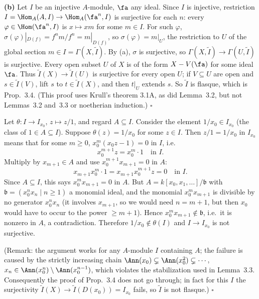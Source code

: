 \documentclass[11pt]{article}
\begin{document}
\textbf{(b)} Let $I$ be an injective $A$-module, $\fa$ any ideal. Since $I$ is injective, restriction $I=\Hom_A(A,I)\to\Hom_A(\fa^n,I)$ is surjective for each $n$: every $\varphi\in\Hom(\fa^n,I)$ is $x\mapsto xm$ for some $m\in I$. For such $\varphi$, $\sigma(\varphi)|_{D(f)}=f^nm/f^n=m|_{D(f)}$, so $\sigma(\varphi)=m|_U$, the restriction to $U$ of the global section $m\in I=\Gamma(X,\widetilde I)$. By (a), $\sigma$ is surjective, so $\Gamma(X,\widetilde I)\to\Gamma(U,\widetilde I)$ is surjective. Every open subset $U$ of $X$ is of the form $X-V(\fa)$ for some ideal $\fa$. Thus $\widetilde I(X)\to\widetilde I(U)$ is surjective for every open $U$; if $V\subseteq U$ are open and $s\in\widetilde I(V)$, lift $s$ to $t\in\widetilde I(X)$, and then $t|_U$ extends $s$. So $\widetilde I$ is flasque, which is Prop.~3.4. (This proof uses Krull's theorem 3.1A, as did Lemma~3.2, but not Lemmas~3.2 and~3.3 or noetherian induction.) \hfill$\square$

\pf
Let $\theta:I\to I_{x_0}$, $z\mapsto z/1$, and regard $A\subseteq I$. Consider the element $1/x_0\in I_{x_0}$ (the class of $1\in A\subseteq I$). Suppose $\theta(z)=1/x_0$ for some $z\in I$. Then $z/1=1/x_0$ in $I_{x_0}$ means that for some $m\ge0$, $x_0^m(x_0z-1)=0$ in $I$, i.e.
\[
x_0^{m+1}z=x_0^m\cdot1\quad\text{in }I.
\]
Multiply by $x_{m+1}\in A$ and use $x_0^{m+1}x_{m+1}=0$ in $A$:
\[
x_{m+1}x_0^m\cdot1=x_{m+1}x_0^{m+1}z=0\quad\text{in }I.
\]
Since $A\subseteq I$, this says $x_0^mx_{m+1}=0$ in $A$. But $A=k[x_0,x_1,\dots]/\mathfrak b$ with $\mathfrak b=(x_0^nx_n\mid n\ge1)$ a monomial ideal, and the monomial $x_0^mx_{m+1}$ is divisible by no generator $x_0^nx_n$ (it involves $x_{m+1}$, so we would need $n=m+1$, but then $x_0$ would have to occur to the power $\ge m+1$). Hence $x_0^mx_{m+1}\notin\mathfrak b$, i.e.\ it is nonzero in $A$, a contradiction. Therefore $1/x_0\notin\theta(I)$ and $I\to I_{x_0}$ is not surjective.

(Remark: the argument works for any $A$-module $I$ containing $A$; the failure is caused by the strictly increasing chain $\Ann(x_0)\subsetneq\Ann(x_0^2)\subsetneq\cdots$, $x_n\in\Ann(x_0^n)\setminus\Ann(x_0^{n-1})$, which violates the stabilization used in Lemma~3.3. Consequently the proof of Prop.~3.4 does not go through; in fact for this $I$ the surjectivity $\widetilde I(X)\to\widetilde I(D(x_0))=I_{x_0}$ fails, so $\widetilde I$ is not flasque.) \hfill$\square$
\end{document}
